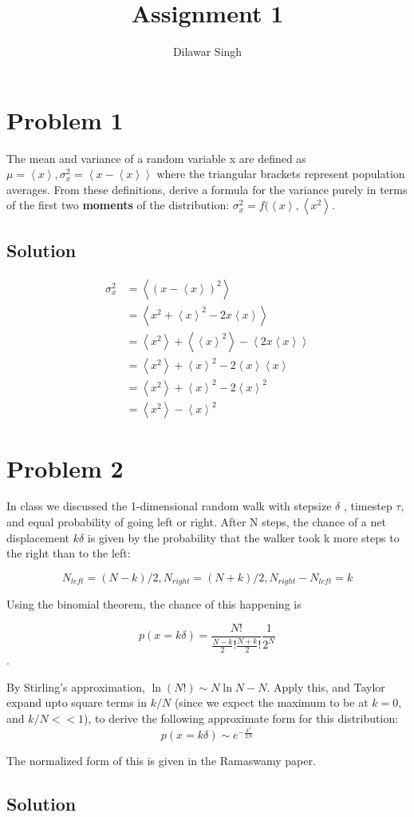 \documentclass[]{article}
\title{Assignment 1}
\author{Dilawar Singh}
\date{}
\begin{document}
\maketitle

\newcommand{\mean}[1]{\left< #1 \right>}

\section{Problem 1}\label{problem-1}

The mean and variance of a random variable x are defined as
$\mu = \mean{x}, \sigma_x^2 = \mean{x - \mean{x}} $ where the triangular
brackets represent population averages. From these definitions, derive a
formula for the variance purely in terms of the first two
\textbf{moments} of the distribution:
$\sigma_x^2 = f(\mean{x}, \mean{x^2}$.

\subsection{Solution}\label{solution}

\[ 
\begin{aligned}
\sigma_x^2 &= \mean{(x - \mean{x})^2}  \\
    &= \mean{x^2 + \mean{x}^2 - 2 x \mean{x}}  \\
    &= \mean{x^2} + \mean{\mean{x}^2} - \mean{2x\mean{x}} \\
    &= \mean{x^2} + \mean{x}^2 - 2\mean{x}\mean{x} \\
    &= \mean{x^2} + \mean{x}^2 - 2\mean{x}^2  \\
    &= \mean{x^2} - \mean{x}^2 
\end{aligned}
\]

\section{Problem 2}\label{problem-2}

In class we discussed the 1-dimensional random walk with stepsize
$\delta$ , timestep $\tau$, and equal probability of going left or
right. After N steps, the chance of a net displacement $k\delta$ is
given by the probability that the walker took k more steps to the right
than to the left:

\[N_{left}=(N-k)/2,N_{right}=(N+k)/2,N_{right}-N_{left}=k\]

Using the binomial theorem, the chance of this happening is

\[ p(x=k\delta)=\frac{N!}{\frac{N-k}{2}!\frac{N+k}{2}!}\frac{1}{2^N}\].

By Stirling's approximation, $\ln(N!) \sim N\ln N-N$. Apply this, and
Taylor expand upto square terms in $k/N$ (since we expect the maximum to
be at $k = 0$, and $k/N << 1$), to derive the following approximate form
for this distribution: \[ p(x = k \delta) \sim  e^{-\frac{k^2}{2N}} \]

The normalized form of this is given in the Ramaswamy paper.

\subsection{Solution}\label{solution-1}
\end{document}
